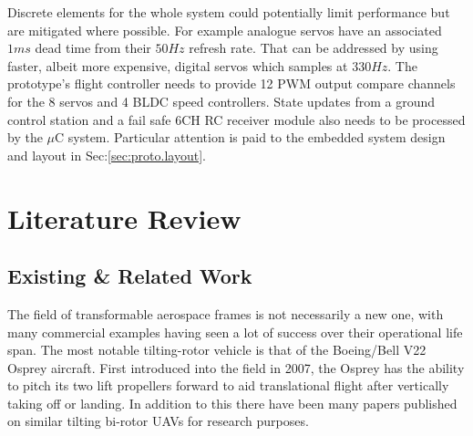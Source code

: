 Discrete elements for the whole system could potentially limit performance but are mitigated where possible. For example analogue servos have an associated $1 ms$ dead time from their $50 Hz$ refresh rate. That can be addressed by using faster, albeit more expensive, digital servos which samples at $330 Hz$. The prototype's flight controller needs to provide 12 PWM output compare channels for the 8 servos and 4 BLDC speed controllers. State updates from a ground control station and a fail safe 6CH RC receiver module also needs to be processed by the $\mu$C system. Particular attention is paid to the embedded system design and layout in Sec:\ref{sec:proto.layout}.%
\section{Literature Review}
\label{sec:intro.litreview}
\subsection{Existing \& Related Work}
\label{subsec:intro.lit.related}
The field of transformable aerospace frames is not necessarily a new one, with many commercial examples having seen a lot of success over their operational life span. The most notable tilting-rotor vehicle is that of the Boeing/Bell V22 Osprey\cite{osprey} aircraft. First introduced into the field in 2007, the Osprey has the ability to pitch its two lift propellers forward to aid translational flight after vertically taking off or landing. In addition to this there have been many papers published on similar tilting bi-rotor UAVs for research purposes.

